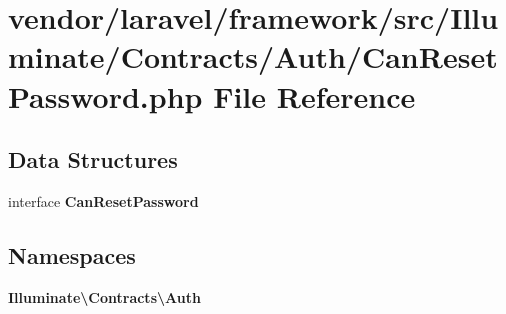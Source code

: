 \section{vendor/laravel/framework/src/\+Illuminate/\+Contracts/\+Auth/\+Can\+Reset\+Password.php File Reference}
\label{_contracts_2_auth_2_can_reset_password_8php}
\subsection*{Data Structures}
\begin{DoxyCompactItemize}
\item 
interface {\bf Can\+Reset\+Password}
\end{DoxyCompactItemize}
\subsection*{Namespaces}
\begin{DoxyCompactItemize}
\item 
 {\bf Illuminate\textbackslash{}\+Contracts\textbackslash{}\+Auth}
\end{DoxyCompactItemize}
